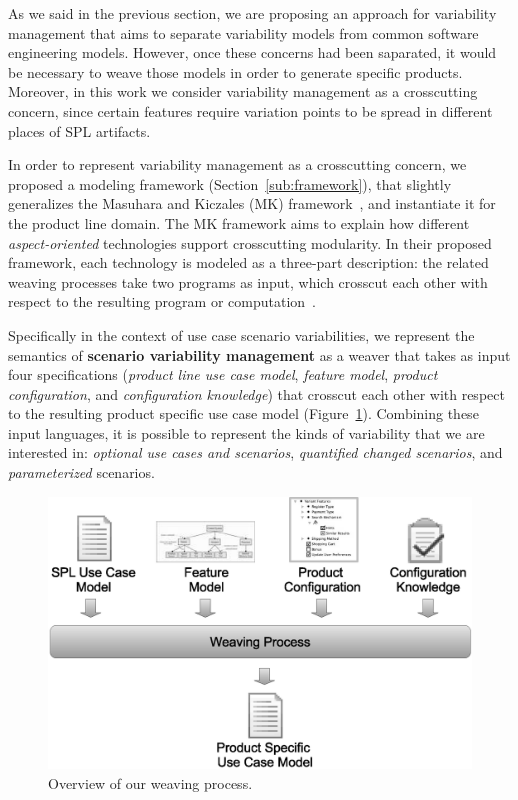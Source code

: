 \documentclass[times, 11pt,twocolumn]{article}
\begin{document}
As we said in the previous section, we are proposing an approach for
variability management that aims to separate variability models
from common software engineering models. However, once these concerns 
had been saparated, it would be necessary to weave those models in order to 
generate specific products. Moreover, in this work we consider variability
management as a crosscutting concern, since certain features require variation
points to be spread in different places of SPL artifacts. 

In order to represent variability management as a crosscutting concern, we
proposed a modeling framework (Section~\ref{sub:framework}), that slightly
generalizes the Masuhara and Kiczales (MK) framework~\cite{Masuhara:2003aa}, and instantiate it for the 
product line domain. The MK framework aims to explain
how different \emph{aspect-oriented} technologies support crosscutting
modularity. In their proposed framework, each technology is modeled as a
three-part description: the related weaving processes take two programs as input, 
which crosscut each other with respect to the resulting program or
computation~\cite{Masuhara:2003aa}.

Specifically in the context of use case scenario variabilities, we represent the
semantics of \textbf{scenario variability management} as a weaver that takes as input four specifications
(\emph{product line use case model}, \emph{feature model}, \emph{product
configuration}, and \emph{configuration knowledge}) that crosscut each other with
respect to the resulting product specific use case model
(Figure~\ref{fig:weave-process}). Combining these input languages, it is possible
to represent the kinds of variability that we are interested in: \emph{optional
use cases and scenarios}, \emph{quantified changed scenarios}, and
\emph{parameterized} scenarios.

\begin{figure}[t]
 \begin{center}
  \includegraphics[scale=0.35]{../images/weave-process.eps}
  \caption{Overview of our weaving process.}
  \label{fig:weave-process}
  \end{center}
\end{figure}
\end{document}
